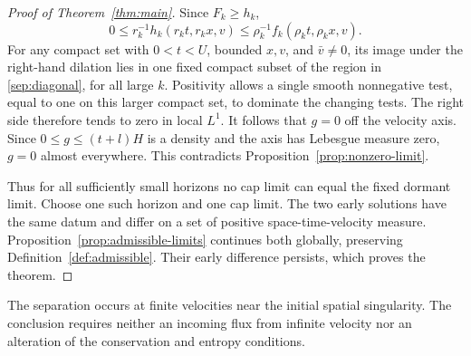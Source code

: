 \begin{proof}[Proof of Theorem~\ref{thm:main}]
Since \(F_k\ge h_k\),
\[
0\le r_k^{-1}h_k(r_kt,r_kx,v)
 \le\rho_k^{-1}f_k(\rho_kt,\rho_kx,v).
\]
For any compact set with \(0<t<U\), bounded \(x,v\), and
\(\bar v\ne0\), its image under the right-hand dilation lies in one
fixed compact subset of the region in \eqref{sep:diagonal}, for all
large \(k\). Positivity allows a single smooth nonnegative test,
equal to one on this larger compact set, to dominate the changing
tests. The right side therefore tends to zero in local \(L^1\).
It follows that \(g=0\) off the velocity axis. Since
\(0\le g\le(t+l)H\) is a density and the axis has Lebesgue measure
zero, \(g=0\) almost everywhere. This contradicts
Proposition~\ref{prop:nonzero-limit}.

Thus for all sufficiently small horizons no cap limit can equal
the fixed dormant limit. Choose one such horizon and one cap limit.
The two early solutions have the same datum and differ on a set of
positive space-time-velocity measure. Proposition~\ref{prop:admissible-limits}
continues both globally, preserving Definition~\ref{def:admissible}.
Their early difference persists, which proves the theorem.
\end{proof}

The separation occurs at finite velocities near the initial spatial
singularity. The conclusion requires neither an incoming flux from
infinite velocity nor an alteration of the conservation and entropy
conditions.
